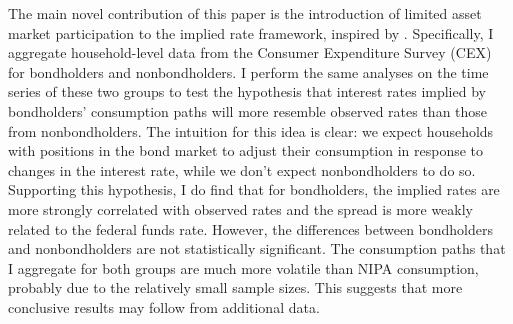 The main novel contribution of this paper is the introduction of limited asset market participation to the implied rate framework, inspired by \cite{vissing02}. Specifically, I aggregate household-level data from the Consumer Expenditure Survey (CEX) for bondholders and nonbondholders. I perform the same analyses on the time series of these two groups to test the hypothesis that interest rates implied by bondholders' consumption paths will more resemble observed rates than those from nonbondholders. The intuition for this idea is clear: we expect households with positions in the bond market to adjust their consumption in response to changes in the interest rate, while we don't expect nonbondholders to do so. Supporting this hypothesis, I do find that for bondholders, the implied rates are more strongly correlated with observed rates and the spread is more weakly related to the federal funds rate. However, the differences between bondholders and nonbondholders are not statistically significant. The consumption paths that I aggregate for both groups are much more volatile than NIPA consumption, probably due to the relatively small sample sizes. This suggests that more conclusive results may follow from additional data.